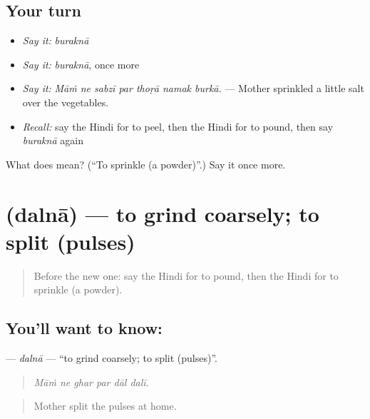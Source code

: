 \subsection*{Your turn}
\begin{itemize}
\raggedright
  \item \emph{Say it:} \emph{buraknā}
  \item \emph{Say it:} \emph{buraknā}, once more
  \item \emph{Say it:} \emph{Māṁ ne sabzī par thoṛā namak burkā.} — Mother sprinkled a little salt over the vegetables.
  \item \emph{Recall:} say the Hindi for to peel, then the Hindi for to pound, then say \emph{buraknā} again
\end{itemize}

\begin{tcolorbox}[breakable,colback=teal!4,colframe=teal!35!black,title={Before you move on}]
What does  mean? (\textquotedblleft{}To sprinkle (a powder)\textquotedblright{}.) Say it once more.
\end{tcolorbox}
\section[\texorpdfstring{\hi{दलना} (dalnā)}{दलना (dalnā)}]{ (dalnā) — to grind coarsely; to split (pulses)}

\label{lesson:HI-C523-dalnagrind}



\begin{quote}
Before the new one: say the Hindi for to pound, then the Hindi for to sprinkle (a powder).
\end{quote}

\subsection*{You'll want to know: }
\textbf{} — \emph{dalnā} — \textquotedblleft{}to grind coarsely; to split (pulses)\textquotedblright{}.

\begin{quote}
     
\end{quote}

\begin{quote}
\emph{Māṁ ne ghar par dāl dalī.}
\end{quote}

\begin{quote}
Mother split the pulses at home.
\end{quote}

